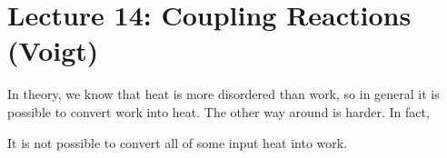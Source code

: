 \section*{Lecture 14: Coupling Reactions (Voigt)}
\setcounter{section}{14}

In theory, we know that heat is more disordered than work, so in general it is possible to convert work into heat. 
The other way around is harder.
In fact, 

\begin{fact}
	It is not possible to convert all of some input heat into work.
\end{fact}	
